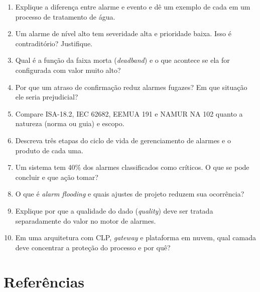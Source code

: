 \begin{enumerate}
\def\labelenumi{\arabic{enumi}.}
\tightlist
\item
  Explique a diferença entre alarme e evento e dê um exemplo de cada em um processo de tratamento de água.
\item
  Um alarme de nível alto tem severidade alta e prioridade baixa. Isso é contraditório? Justifique.
\item
  Qual é a função da faixa morta (\emph{deadband}) e o que acontece se ela for configurada com valor muito alto?
\item
  Por que um atraso de confirmação reduz alarmes fugazes? Em que situação ele seria prejudicial?
\item
  Compare ISA-18.2, IEC 62682, EEMUA 191 e NAMUR NA 102 quanto a natureza (norma ou guia) e escopo.
\item
  Descreva três etapas do ciclo de vida de gerenciamento de alarmes e o produto de cada uma.
\item
  Um sistema tem 40\% dos alarmes classificados como críticos. O que se pode concluir e que ação tomar?
\item
  O que é \emph{alarm flooding} e quais ajustes de projeto reduzem sua ocorrência?
\item
  Explique por que a qualidade do dado (\emph{quality}) deve ser tratada separadamente do valor no motor de alarmes.
\item
  Em uma arquitetura com CLP, \emph{gateway} e plataforma em nuvem, qual camada deve concentrar a proteção do processo e por quê?
\end{enumerate}

\section{Referências}\label{referuxeancias}

